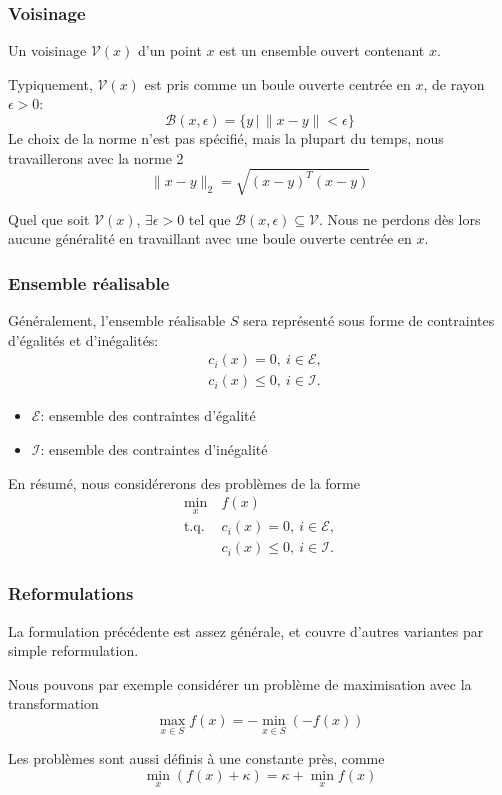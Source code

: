 \documentclass[usepdftitle=false]{beamer}
\def\cB{\mathcal{B}}
\def\cV{\mathcal{V}}
\begin{document}
\begin{frame}
\frametitle{Voisinage}

Un voisinage $\cV(x)$ d'un point $x$ est un ensemble ouvert contenant $x$.

\mbox{}

Typiquement, $\cV(x)$ est pris comme un boule ouverte centrée en $x$, de rayon $\epsilon > 0$:
$$
\cB(x,\epsilon) = \lbrace y \,|\, \| x-y \| < \epsilon\rbrace
$$
Le choix de la norme n'est pas spécifié, mais la plupart du temps, nous travaillerons avec la norme 2
$$
\|x-y\|_2 = \sqrt{ (x-y)^T(x-y) }
$$

\mbox{}

Quel que soit $\cV(x)$, $\exists \epsilon > 0$ tel que $\cB(x,\epsilon) \subseteq \cV$.
Nous ne perdons dès lors aucune généralité en travaillant avec une boule ouverte centrée en $x$.

\end{frame}

\begin{frame}
\frametitle{Ensemble réalisable}

Généralement, l'ensemble réalisable $S$ sera représenté sous forme de contraintes d'égalités et d'inégalités:
\begin{align*}
& c_i(x) = 0,\ i \in \mathcal{E}, \\
& c_i(x) \leq 0,\ i \in \mathcal{I}.
\end{align*}

\mbox{}
	
\begin{itemize}
\item 
$\mathcal{E}$: ensemble des contraintes d'égalité
\item 
$\mathcal{I}$: ensemble des contraintes d'inégalité
\end{itemize}

\mbox{}

En résumé, nous considérerons des problèmes de la forme
\begin{align*}
\min_x\ & f(x) \\
\mbox{t.q. } & c_i(x) = 0,\ i \in \mathcal{E}, \\
& c_i(x) \leq 0,\ i \in \mathcal{I}.
\end{align*}

\end{frame}

\begin{frame}
\frametitle{Reformulations}

La formulation précédente est assez générale, et couvre d'autres variantes par simple reformulation.

\mbox{}

Nous pouvons par exemple considérer un problème de maximisation avec la transformation
\[
\max_{x \in S} f(x) = -\min_{x \in S} (-f(x))
\]

\mbox{}

Les problèmes sont aussi définis à une constante près, comme
\[
\min_x (f(x)+\kappa) = \kappa + \min_x f(x)
\]

\end{frame}
\end{document}
